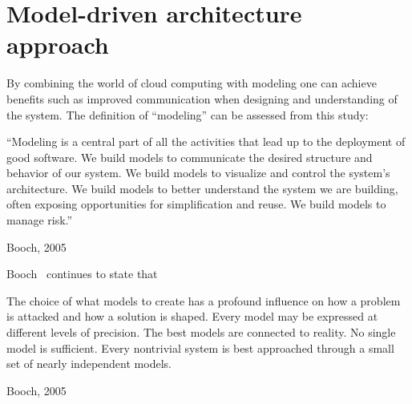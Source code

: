 \section{Model-driven architecture approach}

By combining the world of cloud computing with modeling one can achieve benefits such as  
improved communication when designing and understanding of the system.
The definition of ``modeling'' can be assessed from this study:
\epigraph{
  ``Modeling is a central
  part of all the activities that lead up to the deployment of good
  software. We build models to communicate the desired structure and
  behavior of our system. We build models to visualize and control the
  system's architecture. We build models to better understand the
  system we are building, often exposing opportunities for
  simplification and reuse. We build models to manage risk.''
}{Booch, 2005}
Booch~\cite{unified:booch05} continues to state that
\epigraph{
  \begin{ii}\iitem The choice
  of what models to create has a profound influence on how a problem
  is attacked and how a solution is shaped. \iitem Every model may be
  expressed at different levels of precision. \iitem The best models
  are connected to reality. \iitem No single model is
  sufficient. Every nontrivial system is best approached through a
  small set of nearly independent models.\end{ii}
}{Booch, 2005}
